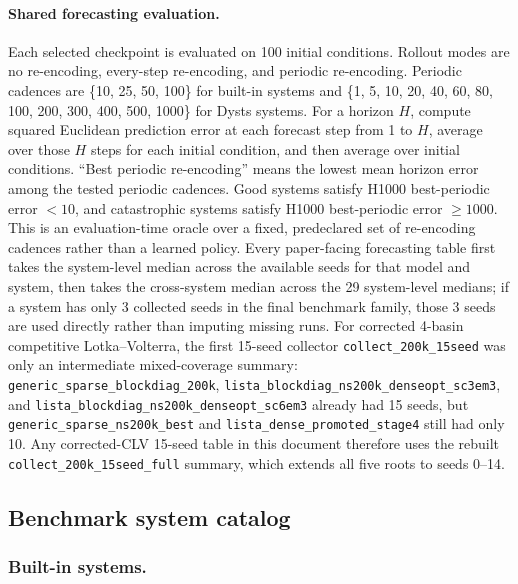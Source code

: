 \paragraph{Shared forecasting evaluation.}
Each selected checkpoint is evaluated on 100 initial conditions. Rollout modes
are no re-encoding, every-step re-encoding, and periodic re-encoding. Periodic
cadences are \{10, 25, 50, 100\} for built-in systems and
\{1, 5, 10, 20, 40, 60, 80, 100, 200, 300, 400, 500, 1000\} for Dysts systems.
For a horizon $H$, compute squared Euclidean prediction error at each forecast
step from 1 to $H$, average over those $H$ steps for each initial condition, and
then average over initial conditions. ``Best periodic re-encoding'' means the
lowest mean horizon error among the tested periodic cadences. Good systems satisfy
H1000 best-periodic error $< 10$, and catastrophic systems satisfy H1000
best-periodic error $\ge 1000$. This is an evaluation-time oracle over a fixed,
predeclared set of re-encoding cadences rather than a learned policy. Every
paper-facing forecasting table first takes the system-level median across the
available seeds for that model and system, then takes the cross-system median
across the 29 system-level medians; if a system has only 3 collected seeds in
the final benchmark family, those 3 seeds are used directly rather than
imputing missing runs. For corrected 4-basin competitive Lotka--Volterra, the
first 15-seed collector \texttt{collect\_200k\_15seed} was only an intermediate
mixed-coverage summary: \texttt{generic\_sparse\_blockdiag\_200k},
\texttt{lista\_blockdiag\_ns200k\_denseopt\_sc3em3}, and
\texttt{lista\_blockdiag\_ns200k\_denseopt\_sc6em3} already had 15 seeds, but
\texttt{generic\_sparse\_ns200k\_best} and
\texttt{lista\_dense\_promoted\_stage4} still had only 10. Any corrected-CLV
15-seed table in this document therefore uses the rebuilt
\texttt{collect\_200k\_15seed\_full} summary, which extends all five roots to
seeds 0--14.

\subsection{Benchmark system catalog}

\subsubsection{Built-in systems.}

{\color{red}{[UDAY: Since we have eight 2 dimensional dynamical system, it would be good to add the phase plots.]}}

